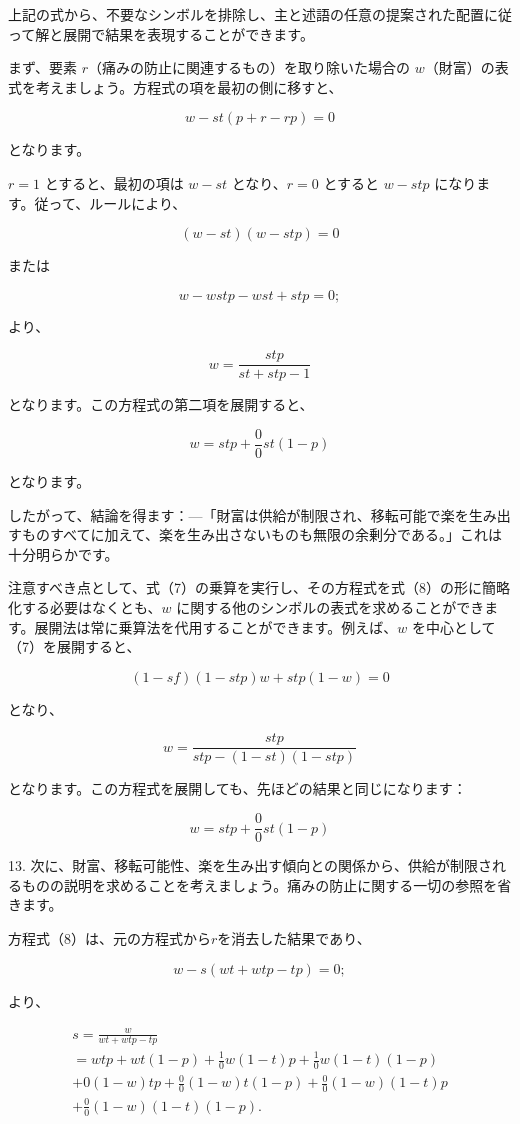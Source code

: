 \documentclass[a4paper,11pt,openany]{ltjsbook}
\begin{document}
上記の式から、不要なシンボルを排除し、主と述語の任意の提案された配置に従って解と展開で結果を表現することができます。

まず、要素 $r$（痛みの防止に関連するもの）を取り除いた場合の $w$（財富）の表式を考えましょう。方程式の項を最初の側に移すと、

\[
w - st(p + r - rp) = 0
\]

となります。

$r = 1$ とすると、最初の項は $w - st$ となり、$r = 0$ とすると $w - stp$ になります。従って、ルールにより、

\[
(w - st)(w - stp) = 0
\]

または

\[
w - wstp - wst + stp = 0;
\]

より、

\[
w = \frac{stp}{st + stp - 1}
\]

となります。この方程式の第二項を展開すると、

\[
w = stp + \frac{0}{0}st(1 - p)
\]

となります。

したがって、結論を得ます：—「財富は供給が制限され、移転可能で楽を生み出すものすべてに加えて、楽を生み出さないものも無限の余剰分である。」これは十分明らかです。

注意すべき点として、式（7）の乗算を実行し、その方程式を式（8）の形に簡略化する必要はなくとも、$w$ に関する他のシンボルの表式を求めることができます。展開法は常に乗算法を代用することができます。例えば、$w$ を中心として（7）を展開すると、

\[
(1 - sf)(1 - stp)w + stp(1 - w) = 0
\]

となり、

\[
w = \frac{stp}{stp - (1 - st)(1 - stp)}
\]

となります。この方程式を展開しても、先ほどの結果と同じになります：

\[
w = stp + \frac{0}{0}st(1 - p)
\]

13. 次に、財富、移転可能性、楽を生み出す傾向との関係から、供給が制限されるものの説明を求めることを考えましょう。痛みの防止に関する一切の参照を省きます。

方程式（8）は、元の方程式から$r$を消去した結果であり、

\[
w - s \left(wt + wtp - tp\right) = 0;
\]

より、

\begin{eqnarray*}
s = \frac{w}{wt + wtp - tp}\\
= wtp + wt(1-p) + \frac{1}{0} w(1-t)p + \frac{1}{0}w (1-t)(1-p)\\
+ 0 (1-w) tp + \frac{0}{0} (1-w) t (1-p) + \frac{0}{0} (1-w)(1-t) p\\
+ \frac{0}{0} (1-w) (1-t) (1-p).
\end{eqnarray*}
\end{document}
